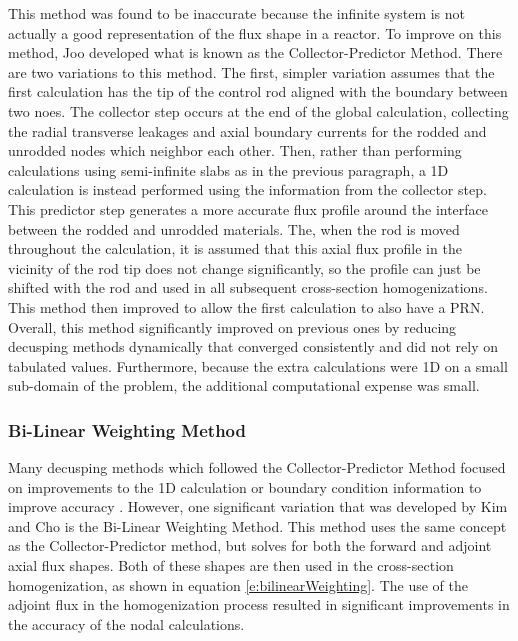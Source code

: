 This method was found to be inaccurate because the infinite system is not actually a good representation of the flux shape in a reactor.  To improve on this method, Joo developed what is known as the Collector-Predictor Method.  There are two variations to this method.  The first, simpler variation assumes that the first calculation has the tip of the control rod aligned with the boundary between two noes.  The collector step occurs at the end of the global calculation, collecting the radial transverse leakages and axial boundary currents for the rodded and unrodded nodes which neighbor each other.  Then, rather than performing calculations using semi-infinite slabs as in the previous paragraph, a 1D calculation is instead performed using the information from the collector step.  This predictor step generates a more accurate flux profile around the interface between the rodded and unrodded materials.  The, when the rod is moved throughout the calculation, it is assumed that this axial flux profile in the vicinity of the rod tip does not change significantly, so the profile can just be shifted with the rod and used in all subsequent cross-section homogenizations.  This method then improved to allow the first calculation to also have a PRN.  Overall, this method significantly improved on previous ones by reducing decusping methods dynamically that converged consistently and did not rely on tabulated values.  Furthermore, because the extra calculations were 1D on a small sub-domain of the problem, the additional computational expense was small.

\subsubsection{Bi-Linear Weighting Method}

Many decusping methods which followed the Collector-Predictor Method focused on improvements to the 1D calculation or boundary condition information to improve accuracy \cite{gehinThesis1992quasi,smith1992enhancementsStudxvickCoreManagementSystem,lee1998CuspingCorrection1DFineMeshFluxProfiles,downar2004PARCStheory}.  However, one significant variation that was developed by Kim and Cho \cite{kim1990BilinearWeighting} is the Bi-Linear Weighting Method.  This method uses the same concept as the Collector-Predictor method, but solves for both the forward and adjoint axial flux shapes.  Both of these shapes are then used in the cross-section homogenization, as shown in equation \ref{e:bilinearWeighting}.  The use of the adjoint flux in the homogenization process resulted in significant improvements in the accuracy of the nodal calculations.

